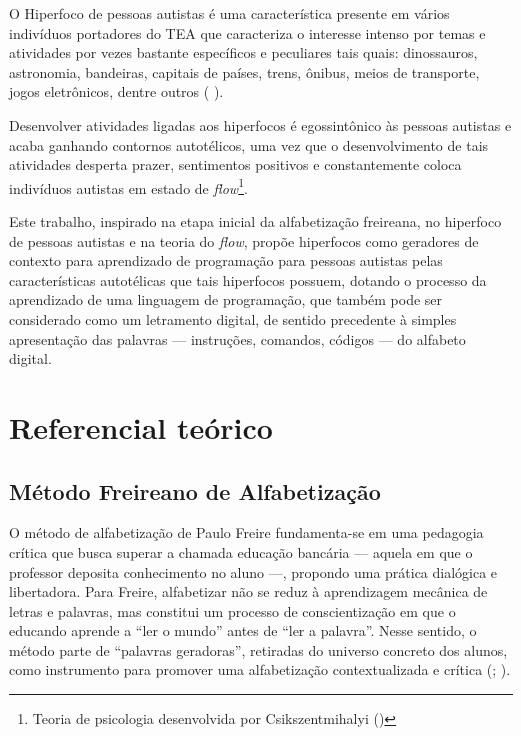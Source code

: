 \documentclass[
  12pt,
  a4paper,
]{article}
\begin{document}
O Hiperfoco de pessoas autistas é uma característica presente em vários
indivíduos portadores do TEA que caracteriza o interesse intenso por
temas e atividades por vezes bastante específicos e peculiares tais
quais: dinossauros, astronomia, bandeiras, capitais de países, trens,
ônibus, meios de transporte, jogos eletrônicos, dentre outros
( ).

Desenvolver atividades ligadas aos hiperfocos é egossintônico às pessoas
autistas e acaba ganhando contornos autotélicos, uma vez que o
desenvolvimento de tais atividades desperta prazer, sentimentos
positivos e constantemente coloca indivíduos autistas em estado de
\emph{flow}\footnote{ Teoria de psicologia desenvolvida por
  Csikszentmihalyi ()}.

Este trabalho, inspirado na etapa inicial da alfabetização freireana, no
hiperfoco de pessoas autistas e na teoria do \emph{flow}, propõe
hiperfocos como geradores de contexto para aprendizado de programação
para pessoas autistas pelas características autotélicas que tais
hiperfocos possuem, dotando o processo da aprendizado de uma linguagem
de programação, que também pode ser considerado como um letramento
digital, de sentido precedente à simples apresentação das palavras ---
instruções, comandos, códigos --- do alfabeto digital.

\section{Referencial teórico}\label{sec:referencial-teorico}

\subsection{Método Freireano de
Alfabetização}\label{muxe9todo-freireano-de-alfabetizauxe7uxe3o}

O método de alfabetização de Paulo Freire fundamenta-se em uma pedagogia
crítica que busca superar a chamada educação bancária --- aquela em que
o professor deposita conhecimento no aluno ---, propondo uma prática
dialógica e libertadora. Para Freire, alfabetizar não se reduz à
aprendizagem mecânica de letras e palavras, mas constitui um processo de
conscientização em que o educando aprende a ``ler o mundo'' antes de
``ler a palavra''. Nesse sentido, o método parte de ``palavras
geradoras'', retiradas do universo concreto dos alunos, como instrumento
para promover uma alfabetização contextualizada e crítica
(;
 ).
\end{document}
